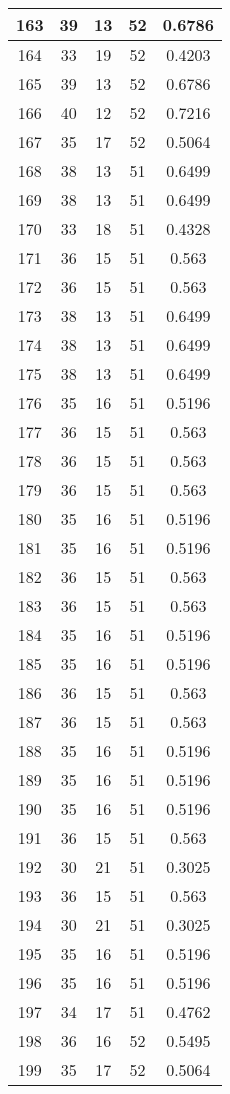 \documentclass[letterpaper, 12pt]{article}
\begin{document}
\begin{longtable}{|c|c|c|c|c|}
\hline
163 & 39 & 13 & 52 & 0.6786 \\
\hline
164 & 33 & 19 & 52 & 0.4203 \\
\hline
165 & 39 & 13 & 52 & 0.6786 \\
\hline
166 & 40 & 12 & 52 & 0.7216 \\
\hline
167 & 35 & 17 & 52 & 0.5064 \\
\hline
168 & 38 & 13 & 51 & 0.6499 \\
\hline
169 & 38 & 13 & 51 & 0.6499 \\
\hline
170 & 33 & 18 & 51 & 0.4328 \\
\hline
171 & 36 & 15 & 51 & 0.563 \\
\hline
172 & 36 & 15 & 51 & 0.563 \\
\hline
173 & 38 & 13 & 51 & 0.6499 \\
\hline
174 & 38 & 13 & 51 & 0.6499 \\
\hline
175 & 38 & 13 & 51 & 0.6499 \\
\hline
176 & 35 & 16 & 51 & 0.5196 \\
\hline
177 & 36 & 15 & 51 & 0.563 \\
\hline
178 & 36 & 15 & 51 & 0.563 \\
\hline
179 & 36 & 15 & 51 & 0.563 \\
\hline
180 & 35 & 16 & 51 & 0.5196 \\
\hline
181 & 35 & 16 & 51 & 0.5196 \\
\hline
182 & 36 & 15 & 51 & 0.563 \\
\hline
183 & 36 & 15 & 51 & 0.563 \\
\hline
184 & 35 & 16 & 51 & 0.5196 \\
\hline
185 & 35 & 16 & 51 & 0.5196 \\
\hline
186 & 36 & 15 & 51 & 0.563 \\
\hline
187 & 36 & 15 & 51 & 0.563 \\
\hline
188 & 35 & 16 & 51 & 0.5196 \\
\hline
189 & 35 & 16 & 51 & 0.5196 \\
\hline
190 & 35 & 16 & 51 & 0.5196 \\
\hline
191 & 36 & 15 & 51 & 0.563 \\
\hline
192 & 30 & 21 & 51 & 0.3025 \\
\hline
193 & 36 & 15 & 51 & 0.563 \\
\hline
194 & 30 & 21 & 51 & 0.3025 \\
\hline
195 & 35 & 16 & 51 & 0.5196 \\
\hline
196 & 35 & 16 & 51 & 0.5196 \\
\hline
197 & 34 & 17 & 51 & 0.4762 \\
\hline
198 & 36 & 16 & 52 & 0.5495 \\
\hline
199 & 35 & 17 & 52 & 0.5064 \\
\hline
\end{longtable}
\end{document}
